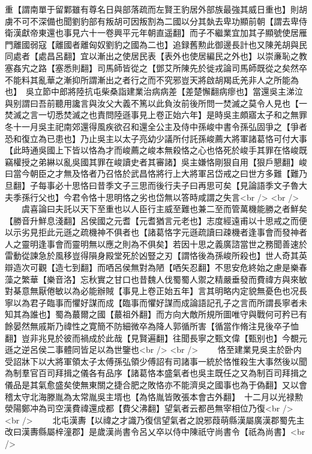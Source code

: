 重【謂南單于留鄴雖有尊名日與部落疏而左賢王豹居外部族最強其威日重也】則胡虜不可不深備也聞劉豹部有叛胡可因叛割為二國以分其埶去卑功顯前朝【謂去卑侍衛漢獻帝東還也事見六十一卷興平元年朝直遥翻】而子不繼業宜加其子顯號使居雁門離國弱寇【離國者離匈奴劉豹之國為二也】追録舊勲此御邊長計也又陳羌胡與民同處者【處昌呂翻】宜以漸出之使居民表【表外也使居編民之外也】以崇亷恥之教塞姦宄之路【塞悉則翻】司馬師皆從之【鄧艾所陳先於徙戎論司馬師既從之矣然卒不能料其亂華之漸抑所謂漸出之者行之而不究邪豈天將啟胡羯氐羌非人之所能為也】　吳立節中郎將陸抗屯柴桑詣建業治病病差【差楚懈翻病瘳也】當還吳主涕泣與别謂曰吾前聽用讒言與汝父大義不篤以此負汝前後所問一焚滅之莫令人見也【一焚滅之言一切悉焚滅之也責問陸遜事見上卷正始六年】是時吳主頗寤太子和之無罪冬十一月吳主祀南郊還得風疾欲召和還全公主及侍中孫峻中書令孫弘固爭之【爭者恐和復立為已患也】乃止吳主以太子亮幼少議所付託孫峻薦大將軍諸葛恪可付大事【此時通吳國上下皆以恪為才而峻薦之峻本無殺恪之心也恪死於峻手其罪在恪峻既竊權授之弟綝以亂吳國其罪在峻讀史者其審諸】吳主嫌恪剛狠自用【狠戶懇翻】峻曰當今朝臣之才無及恪者乃召恪於武昌恪將行上大將軍呂岱戒之曰世方多難【難乃旦翻】子每事必十思恪曰昔季文子三思而後行夫子曰再思可矣【見論語季文子魯大夫季孫行父也】今君令恪十思明恪之劣也岱無以答時咸謂之失言<br />
<br />
　　虞喜論曰夫託以天下至重也以人臣行主威至難也兼二至而管萬機能勝之者鮮矣【勝音升鮮息淺翻】呂侯國之元耆【元耆猶言元老也】志度經遠甫以十思戒之而便以示劣見拒此元遜之疏機神不俱者也【諸葛恪字元遜疏讀曰疎機者逢事會而發神者人之靈明逢事會而靈明無以應之則為不俱矣】若因十思之義廣諮當世之務聞善速於雷動從諫急於風移豈得隕身殿堂死於凶豎之刃【謂恪後為孫峻所殺也】世人奇其英辯造次可觀【造七到翻】而哂呂侯無對為陋【哂矢忍翻】不思安危終始之慮是樂春藻之繁華【樂音洛】忘秋實之甘口也昔魏人伐蜀蜀人禦之精嚴垂發而費禕方與來敏對棊意無厭倦敏以為必能辦賊【事見上卷正始五年】言其明略内定貌無憂色也况長寧以為君子臨事而懼好謀而成【臨事而懼好謀而成論語記孔子之言而所謂長寧者未知其為誰也】蜀為蕞爾之國【蕞祖外翻】而方向大敵所規所圖唯守與戰何可矜已有餘晏然無戚斯乃禕性之寛簡不防細微卒為降人郭循所害【循當作脩注見後卒子恤翻】豈非兆見於彼而禍成於此哉【見賢遍翻】往聞長寧之甄文偉【甄别也】今覩元遜之逆呂侯二事體同皆足以為世鑒也<br />
<br />
　　恪至建業見吳主於卧内受詔牀下以大將軍領太子太傅孫弘領少傅詔有司諸事一統於恪惟殺生大事然後以聞為制羣官百司拜揖之儀各有品序【諸葛恪本盛氣者也吳主既任之又為制百司拜揖之儀品是其氣愈盛矣使無東關之捷合肥之敗恪亦不能濟吳之國事也為于偽翻】又以會稽太守北海滕胤為太常胤吳主壻也【為恪胤皆敗張本會古外翻】　十二月以光禄勲滎陽鄭冲為司空漢費禕還成都【費父沸翻】望氣者云都邑無宰相位乃復<br />
<br />
　　北屯漢夀【以禕之才識乃復信望氣者之說邪葭萌縣漢屬廣漢郡蜀先主改曰漢夀縣屬梓潼郡】是歲漢尚書令呂乂卒以侍中陳祇守尚書令【祇為尚書】<br />
